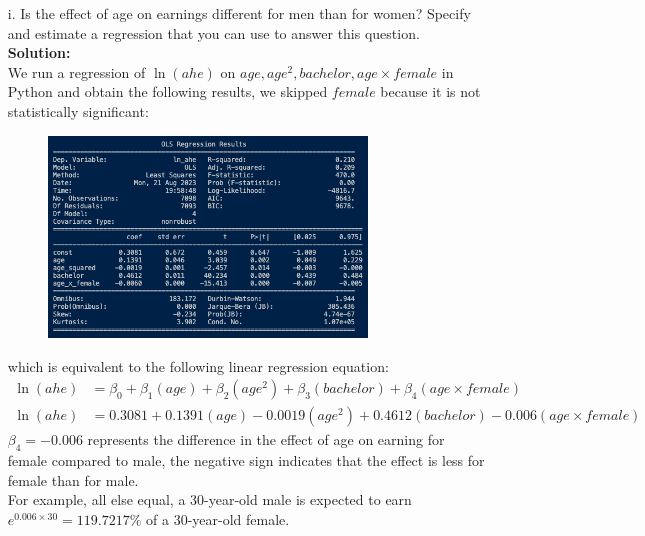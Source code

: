 \documentclass{uofa-eng-assignment}
\begin{document}
\begin{enumerate}
    \item[i.] Is the effect of age on earnings different for men than for women? Specify
        and estimate a regression that you can use to answer this question. \\
        \textbf{Solution:} \\ We run a regression of $\ln{(ahe)}$ on $age, age^2,
            bachelor, age \times female$ in Python and obtain the following results, we
        skipped $female$ because it is not statistically significant:
        \begin{figure}[H]
            \centering
            \includegraphics[width=0.80\textwidth]{final-exam-i-1.png}
        \end{figure}
        which is equivalent to the following linear regression equation:
        \begin{align*}
            \ln{(ahe)} & = \beta_0 + \beta_1 (age) + \beta_2 (age^2) + \beta_3 (bachelor) + \beta_4 (age \times female) \\
            \ln{(ahe)} & = 0.3081 + 0.1391 (age) - 0.0019 (age^2) + 0.4612 (bachelor) - 0.006(age \times female)
        \end{align*}
        $\beta_4 = -0.006$ represents the difference in the effect of age on earning for female compared to male,
        the negative sign indicates that the effect is less for female than for male. \\
        For example, all else equal, a 30-year-old male is expected to earn $e^{0.006 \times 30} = 119.7217\%$
        of a 30-year-old female.

\end{enumerate}
\end{document}
